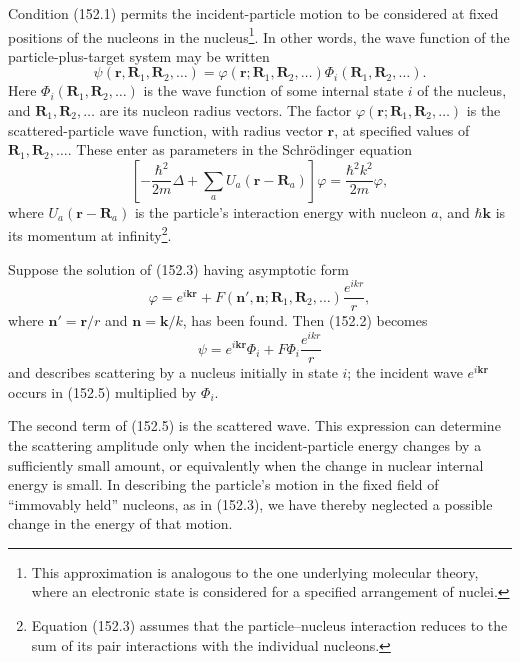 Condition (152.1) permits the incident-particle motion to be considered at fixed positions of the nucleons in the nucleus\footnote{This approximation is analogous to the one underlying molecular theory, where an electronic state is considered for a specified arrangement of nuclei.}. In other words, the wave function of the particle-plus-target system may be written
\begin{equation}
 \psi(\mathbf r,\mathbf R_1,\mathbf R_2,\ldots)
 =\varphi(\mathbf r;\mathbf R_1,\mathbf R_2,\ldots)\Phi_i(\mathbf R_1,\mathbf R_2,\ldots).
 \tag{152.2}
\end{equation}
Here $\Phi_i(\mathbf R_1,\mathbf R_2,\ldots)$ is the wave function of some internal state $i$ of the nucleus, and $\mathbf R_1,\mathbf R_2,\ldots$ are its nucleon radius vectors. The factor $\varphi(\mathbf r;\mathbf R_1,\mathbf R_2,\ldots)$ is the scattered-particle wave function, with radius vector $\mathbf r$, at specified values of $\mathbf R_1,\mathbf R_2,\ldots$. These enter as parameters in the Schrödinger equation
\begin{equation}
 \left[-\frac{\hbar^2}{2m}\Delta+\sum_a U_a(\mathbf r-\mathbf R_a)\right]\varphi
 =\frac{\hbar^2k^2}{2m}\varphi,
 \tag{152.3}
\end{equation}
where $U_a(\mathbf r-\mathbf R_a)$ is the particle's interaction energy with nucleon $a$, and $\hbar\mathbf k$ is its momentum at infinity\footnote{Equation (152.3) assumes that the particle--nucleus interaction reduces to the sum of its pair interactions with the individual nucleons.}.

Suppose the solution of (152.3) having asymptotic form
\begin{equation}
 \varphi=e^{i\mathbf k\mathbf r}+F(\mathbf n',\mathbf n;\mathbf R_1,\mathbf R_2,\ldots)\frac{e^{ikr}}r,
 \tag{152.4}
\end{equation}
where $\mathbf n'=\mathbf r/r$ and $\mathbf n=\mathbf k/k$, has been found. Then (152.2) becomes
\begin{equation}
 \psi=e^{i\mathbf k\mathbf r}\Phi_i+F\Phi_i\frac{e^{ikr}}r
 \tag{152.5}
\end{equation}
and describes scattering by a nucleus initially in state $i$; the incident wave $e^{i\mathbf k\mathbf r}$ occurs in (152.5) multiplied by $\Phi_i$.

The second term of (152.5) is the scattered wave. This expression can determine the scattering amplitude only when the incident-particle energy changes by a sufficiently small amount, or equivalently when the change in nuclear internal energy is small. In describing the particle's motion in the fixed field of ``immovably held'' nucleons, as in (152.3), we have thereby neglected a possible change in the energy of that motion.

